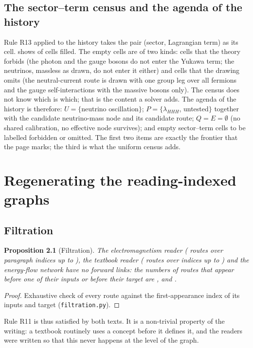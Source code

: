 \documentclass[11pt,a4paper,twoside,openany]{report}
\theoremstyle{plain}
\newtheorem{proposition}[theorem]{Proposition}
\theoremstyle{definition}
\theoremstyle{remark}
\begin{document}
\section{The sector--term census and the agenda of the history}
\begin{table}[htbp]\centering\small
\caption{Sector $\times$ term census of the final Standard Model graph: a filled cell means the sector is a leg of a route into the term.}\label{tab:sectorterm}

\end{table}
Rule R13 applied to the history takes the pair (sector, Lagrangian term) as its cell.  shows \NhepSectorTermEntered{} of \NhepSectorTermCells{} cells filled. The empty cells are of two kinds: cells that the theory forbids (the photon and the gauge bosons do not enter the Yukawa term; the neutrinos, massless as drawn, do not enter it either) and cells that the drawing omits (the neutral-current route is drawn with one group leg over all fermions and the gauge self-interactions with the massive bosons only). The census does not know which is which; that is the content a solver adds. The agenda of the history is therefore: $U=\{$neutrino oscillation$\}$; $P=\{\lambda_{HHH}$, untested$\}$ together with the candidate neutrino-mass node and its candidate route; $Q=E=\emptyset$ (no shared calibration, no effective node survives); and \NhepSectorTermEmpty{} empty sector--term cells to be labelled forbidden or omitted. The first two items are exactly the frontier that the page marks; the third is what the uniform census adds.

\chapter{Regenerating the reading-indexed graphs}\label{ch:readers}

\section{Filtration}
\begin{proposition}[Filtration]\label{prop:filtration}
The electromagnetism reader (\NEMroutes{} routes over \NEMTimePoints{} paragraph indices up to \NEMTmax), the textbook reader (\NUProutes{} routes over \NUPTimePoints{} indices up to \NUPTmax) and the energy-flow network have no forward links: the numbers of routes that appear before one of their inputs or before their target are \NEMForwardLinks{}, \NUPForwardLinks{} and \NLGForwardLinks{}.
\end{proposition}
\begin{proof}
Exhaustive check of every route against the first-appearance index of its inputs and target (\texttt{filtration.py}).
\end{proof}
Rule R11 is thus satisfied by both texts. It is a non-trivial property of the writing: a textbook routinely uses a concept before it defines it, and the readers were written so that this never happens at the level of the graph.
\end{document}
